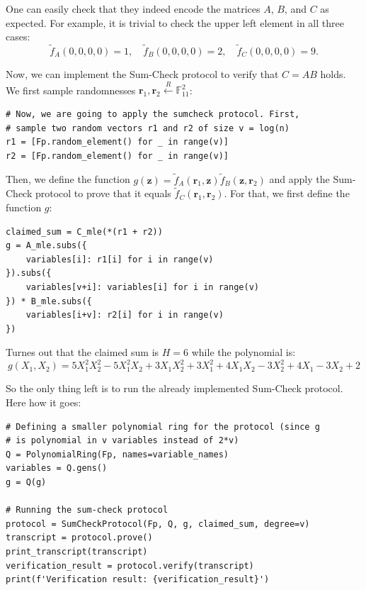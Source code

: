 \documentclass{gkr-template}
\begin{document}
One can easily check that they indeed encode the matrices $A$, $B$, and $C$ as
expected. For example, it is trivial to check the upper left element in all 
three cases:
\begin{equation*}
    \widetilde{f}_A(0,0,0,0) = 1, \quad \widetilde{f}_B(0,0,0,0) = 2, \quad \widetilde{f}_C(0,0,0,0) = 9.
\end{equation*}

Now, we can implement the Sum-Check protocol to verify that $C = AB$ holds. We
first sample randomnesses $\boldsymbol{r}_1, \boldsymbol{r}_2 \xleftarrow{R}
\mathbb{F}_{11}^2$:
\begin{verbatim}
# Now, we are going to apply the sumcheck protocol. First, 
# sample two random vectors r1 and r2 of size v = log(n)
r1 = [Fp.random_element() for _ in range(v)]
r2 = [Fp.random_element() for _ in range(v)]
\end{verbatim}

Then, we define the function $g(\mathbf{z}) = \widetilde{f}_A(\boldsymbol{r}_1,
\mathbf{z})\widetilde{f}_B(\mathbf{z}, \boldsymbol{r}_2)$ and apply the
Sum-Check protocol to prove that it equals $\widetilde{f}_C(\boldsymbol{r}_1,
\boldsymbol{r}_2)$. For that, we first define the function $g$:
\begin{verbatim}
claimed_sum = C_mle(*(r1 + r2))
g = A_mle.subs({
    variables[i]: r1[i] for i in range(v)
}).subs({
    variables[v+i]: variables[i] for i in range(v)
}) * B_mle.subs({
    variables[i+v]: r2[i] for i in range(v)
})
\end{verbatim}

Turnes out that the claimed sum is $H=6$ while the polynomial is:
\begin{equation*}
    g(X_1,X_2) = 5X_1^2X_2^2 - 5X_1^2X_2 + 3X_1X_2^2 + 3X_1^2 + 4X_1X_2 - 3X_2^2 + 4X_1 - 3X_2 + 2
\end{equation*}

So the only thing left is to run the already implemented Sum-Check protocol.
Here how it goes:
\begin{verbatim}
# Defining a smaller polynomial ring for the protocol (since g 
# is polynomial in v variables instead of 2*v)
Q = PolynomialRing(Fp, names=variable_names)
variables = Q.gens()
g = Q(g)

# Running the sum-check protocol
protocol = SumCheckProtocol(Fp, Q, g, claimed_sum, degree=v)
transcript = protocol.prove()
print_transcript(transcript)
verification_result = protocol.verify(transcript)
print(f'Verification result: {verification_result}')
\end{verbatim}
\end{document}
